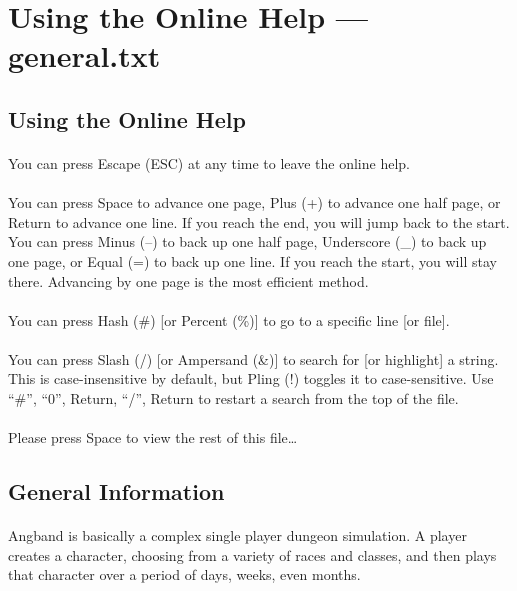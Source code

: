 \section{Using the Online Help --- general.txt}
\subsection{Using the Online Help}
\paragraph{}You can press Escape (ESC) at any time to leave the online help.

\paragraph{}You can press Space to advance one page, Plus (+) to advance one half
page, or Return to advance one line. If you reach the end, you will
jump back to the start. You can press Minus (--) to back up one half
page, Underscore (\_) to back up one page, or Equal (=) to back up one
line. If you reach the start, you will stay there. Advancing by one
page is the most efficient method.

\paragraph{}You can press Hash (\#) [or Percent (\%)] to go to a specific line [or file].

\paragraph{}You can press Slash (/) [or Ampersand (\&)] to search for [or highlight]
a string. This is case-insensitive by default, but Pling (!) toggles it
to case-sensitive. Use ``\#'', ``0'', Return, ``/'', Return to restart a
search from the top of the file.

\paragraph{}Please press Space to view the rest of this file\ldots

\subsection{General Information}
\paragraph{}Angband is basically a complex single player dungeon simulation. A
player creates a character, choosing from a variety of races and
classes, and then plays that character over a period of days, weeks,
even months.

